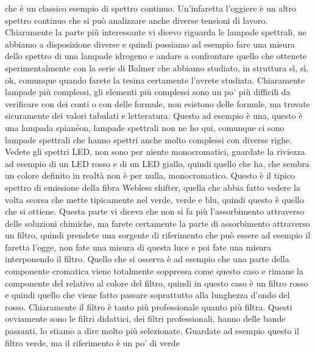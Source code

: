 che è un classico esempio di spettro continuo. Un'infaretta l'oggiere è un altro spettro continuo che si può analizzare anche diverse tensioni di lavoro. Chiaramente la parte più interessante vi dicevo riguarda le lampade spettrali, ne abbiamo a disposizione diverse e quindi possiamo ad esempio fare una misura dello spettro di una lampade idrogeno e andare a confrontare quello che ottenete sperimentalmente con la serie di Balmer che abbiamo studiato, in struttura sì, sì, ok, comunque quando farete la tesina certamente l'avrete studiata. Chiaramente lampade più complessi, gli elementi più complessi sono un po' più difficili da verificare con dei conti o con delle formule, non esistono delle formule, ma trovate sicuramente dei valori tabulati e letteratura. Questo ad esempio è una, questo è una lampada spianéon, lampade spettrali non ne ho qui, comunque ci sono lampade spettrali che hanno spettri anche molto complessi con diverse righe. Vedete gli spettri LED, non sono per niente monocromatici, guardate la riviezza ad esempio di un LED rosso e di un LED giallo, quindi quello che ha, che sembra un colore definito in realtà non è per nulla, monocromatico. Questo è il tipico spettro di emissione della fibra Webless shifter, quella che abbia fatto vedere la volta scorsa che mette tipicamente nel verde, verde e blu, quindi questo è quello che si ottiene. Questa parte vi diceva che non si fa più l'assorbimento attraverso delle soluzioni chimiche, ma farete certamente la parte di assorbimento attraverso un filtro, quindi prendete una sorgente di riferimento che può essere ad esempio il faretta l'ogge, non fate una misura di questa luce e poi fate una misura interponendo il filtro. Quello che si osserva è ad esempio che una parte della componente cromatica viene totalmente soppressa come questo caso e rimane la componente del relativo al colore del filtro, quindi in questo caso è un filtro rosso e quindi quello che viene fatto passare soprattutto alla lunghezza d'ondo del rosso. Chiaramente il filtro è tanto più professionale quanto più filtra. Questi ovviamente sono le filtri didattici, dei filtri professionali, hanno delle bande passanti, lo stiamo a dire molto più selezionate. Guardate ad esempio questo il filtro verde, ma il riferimento è un po' di verde 

